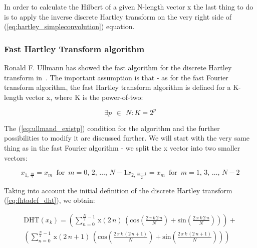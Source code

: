 \documentclass[12pt,twoside,a4paper]{article}
\numberwithin{equation}{subsection}
\numberwithin{figure}{subsection}
\begin{document}
In order to calculate the Hilbert of a given N-length vector x the last thing to do is to apply the inverse discrete Hartley
transform on the very right side of (\ref{eq:hartley_simpleconvolution}) equation.

\subsubsection*{Fast Hartley Transform algorithm}

Ronald F. Ullmann has showed the fast algorithm for the discrete Hartley transform in~\cite{ullmann_algorithm}. The important
assumption is that - as for the fast Fourier transform algorithm, the fast Hartley transform algorithm is defined for a K-length
vector x, where K is the power-of-two:

\begin{equation} \label{eq:ullmand_existp}
  \exists p\,\ \in\ \,N : K=2^{p}
\end{equation}


The (\ref{eq:ullmand_existp}) condition for the algorithm and the further possibilities to modify it are discussed further. We will
start with the very same thing as in the fast Fourier algorithm - we split the x vector into two smaller vectors:

\begin{subequations} \label{eq:hartley_smallervectors}
  \begin{equation}   \label{eq:hsvs_even}
    x_{1, \, \frac     {m}{2}} = x_m \, \mbox{ for } \, m = 0, \, 2, \, \ldots, \, N - 1
  \end{equation}
  \begin{equation}   \label{eq:hsvs_odd}
    x_{2, \, \frac {m - 1}{2}} = x_m \, \mbox{ for } \, m = 1, \, 3, \, \ldots, \, N - 2
  \end{equation}
\end{subequations}

Taking into account the initial definition of the discrete Hartley transform (\ref{eq:fhtadef_dht}), we obtain:

\begin{multline}  \label{eq:hartley_longdht}
 \mathrm{DHT}(x_k) = \left( 
 	\sum_{n = 0}^{\frac {N}{2} - 1} \, \mathrm{x}(2 \, n) \, (
 		\mathrm{cos} \left( \frac {2 \, \pi \, k \, 2 \, n}{N} \right) 
  	  + \mathrm{sin} \left( \frac {2 \, \pi \, k \, 2 \, n}{N} \right) ) \right)  
 + \\ \left( 
 	\sum_{n = 0}^{\frac {N}{2} - 1} \, \mathrm{x}(2 \, n + 1) \, (
 		\mathrm{cos} \left( \frac {2 \, \pi \, k \, (2 \, n + 1)}{N} \right) 
 	  + \mathrm{sin} \left( \frac {2 \, \pi \, k \, (2 \, n + 1)}{N} \right) ) \right)
\end{multline}
\end{document}
